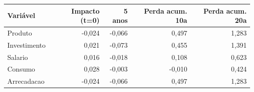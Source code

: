 \begin{tabular}{lrrrr}
\toprule
Variável & Impacto (t=0) & 5 anos & Perda acum. 10a & Perda acum. 20a \\
\midrule
Produto & -0,024 & -0,066 & 0,497 & 1,283 \\
Investimento & 0,021 & -0,073 & 0,455 & 1,391 \\
Salario & 0,016 & -0,018 & 0,108 & 0,623 \\
Consumo & 0,028 & -0,003 & -0,010 & 0,424 \\
Arrecadacao & -0,024 & -0,066 & 0,497 & 1,283 \\
\bottomrule
\end{tabular}
